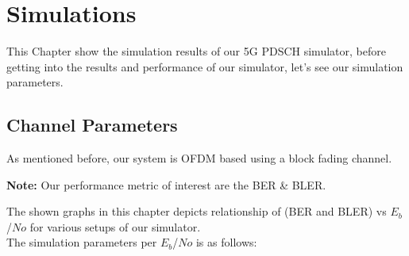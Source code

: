 \chapter{Simulations}
This Chapter show the simulation results of our 5G PDSCH simulator, before getting into the results and performance of our simulator, let's see our simulation parameters.
\section{Channel Parameters}
As mentioned before, our system is OFDM based using a block fading channel.
\begin{GrayBox}
    \textbf{Note:} Our performance metric of interest are the BER \& BLER.
\end{GrayBox}
The shown graphs in this chapter depicts relationship of (BER and BLER) vs $E_b$/$No$ for various setups of our simulator.\\
The simulation parameters per $E_b$/$No$ is as follows:
